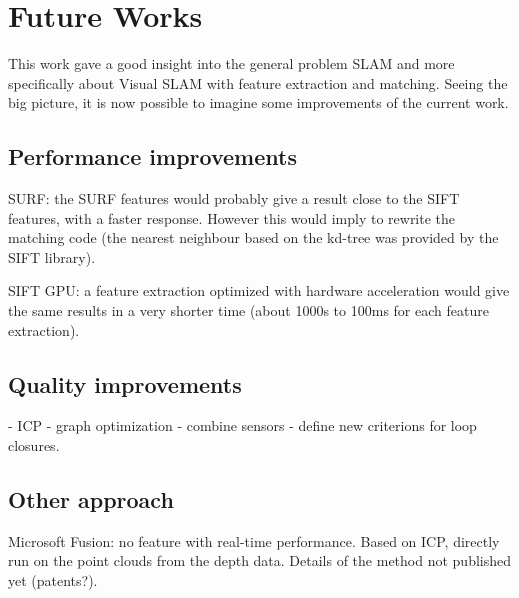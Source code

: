 \documentclass[a4paper,11pt]{kth-mag}
\begin{document}
\chapter{Future Works}

This work gave a good insight into the general problem SLAM and more specifically about Visual SLAM with feature extraction and matching. Seeing the big picture, it is now possible to imagine some improvements of the current work.

\section{Performance improvements}

SURF: the SURF features would probably give a result close to the SIFT features, with a faster response. However this would imply to rewrite the matching code (the nearest neighbour based on the kd-tree was provided by the SIFT library).

SIFT GPU: a feature extraction optimized with hardware acceleration would give the same results in a very shorter time (about 1000s to 100ms for each feature extraction).

\section{Quality improvements}

- ICP
- graph optimization
- combine sensors
- define new criterions for loop closures.

\section{Other approach}

Microsoft Fusion: no feature with real-time performance. Based on ICP, directly run on the point clouds from the depth data. Details of the method not published yet (patents?).

\cleardoublepage
\renewcommand{\bibname}{References}

%  

\end{document}
